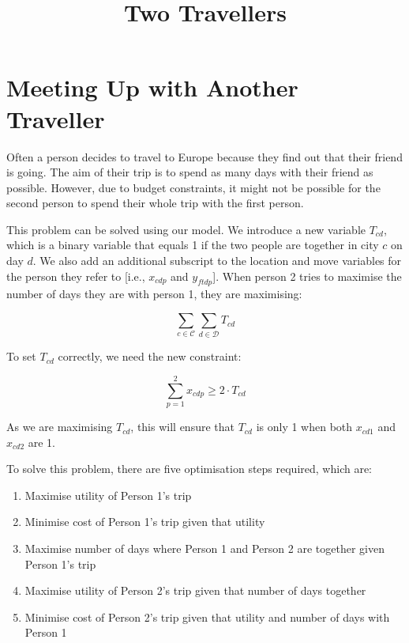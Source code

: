 \documentclass[12pt]{article}
\title{Two Travellers}
\author{}
\date{}
\begin{document}
\maketitle

\section{Meeting Up with Another Traveller}

Often a person decides to travel to Europe because they find out that their friend is going. The aim of their trip is to spend as many days with their friend as possible. However, due to budget constraints, it might not be possible for the second person to spend their whole trip with the first person.

This problem can be solved using our model. We introduce a new variable $T_{cd}$, which is a binary variable that equals 1 if the two people are together in city $c$ on day $d$. We also add an additional subscript to the location and move variables for the person they refer to [i.e., $x_{cdp}$ and $y_{ftdp}$]. When person 2 tries to maximise the number of days they are with person 1, they are maximising:

\begin{equation*}
	\sum_{c \in \mathcal{C}} \sum_{d \in \mathcal{D}} T_{cd}
\end{equation*}

To set $T_{cd}$ correctly, we need the new constraint:

\begin{equation}
	\sum_{p = 1}^{2} x_{cdp} \geq 2 \cdot T_{cd}
\end{equation}

As we are maximising $T_{cd}$, this will ensure that $T_{cd}$ is only 1 when both $x_{cd1}$ and $x_{cd2}$ are 1.

To solve this problem, there are five optimisation steps required, which are:

\begin{enumerate}
	\item Maximise utility of Person 1's trip
	\item Minimise cost of Person 1's trip given that utility
	\item Maximise number of days where Person 1 and Person 2 are together given Person 1's trip
	\item Maximise utility of Person 2's trip given that number of days together
	\item Minimise cost of Person 2's trip given that utility and number of days with Person 1
\end{enumerate}
\end{document}
